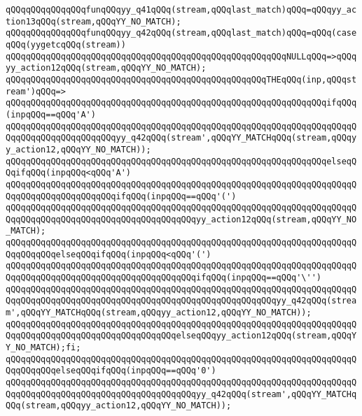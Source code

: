 \verb|qQQqqQQqqQQqqQQqfunqQQqyy_q41qQQq(stream,qQQqlast_match)qQQq=qQQqyy_action13qQQq(stream,qQQqYY_NO_MATCH);|\newline
\verb|qQQqqQQqqQQqqQQqfunqQQqyy_q42qQQq(stream,qQQqlast_match)qQQq=qQQq(caseqQQq(yygetcqQQq(stream))|\newline
\verb|qQQqqQQqqQQqqQQqqQQqqQQqqQQqqQQqqQQqqQQqqQQqqQQqqQQqqQQqNULLqQQq=>qQQqyy_action12qQQq(stream,qQQqYY_NO_MATCH);|\newline
\verb|qQQqqQQqqQQqqQQqqQQqqQQqqQQqqQQqqQQqqQQqqQQqqQQqqQQqTHEqQQq(inp,qQQqstream')qQQq=>|\newline
\verb|qQQqqQQqqQQqqQQqqQQqqQQqqQQqqQQqqQQqqQQqqQQqqQQqqQQqqQQqqQQqqQQqifqQQq(inpqQQq==qQQq'A')|\newline
\verb|qQQqqQQqqQQqqQQqqQQqqQQqqQQqqQQqqQQqqQQqqQQqqQQqqQQqqQQqqQQqqQQqqQQqqQQqqQQqqQQqqQQqqQQqqQQqyy_q42qQQq(stream',qQQqYY_MATCHqQQq(stream,qQQqyy_action12,qQQqYY_NO_MATCH));|\newline
\verb|qQQqqQQqqQQqqQQqqQQqqQQqqQQqqQQqqQQqqQQqqQQqqQQqqQQqqQQqqQQqqQQqelseqQQqifqQQq(inpqQQq<qQQq'A')|\newline
\verb|qQQqqQQqqQQqqQQqqQQqqQQqqQQqqQQqqQQqqQQqqQQqqQQqqQQqqQQqqQQqqQQqqQQqqQQqqQQqqQQqqQQqqQQqqQQqifqQQq(inpqQQq==qQQq'(')|\newline
\verb|qQQqqQQqqQQqqQQqqQQqqQQqqQQqqQQqqQQqqQQqqQQqqQQqqQQqqQQqqQQqqQQqqQQqqQQqqQQqqQQqqQQqqQQqqQQqqQQqqQQqqQQqqQQqyy_action12qQQq(stream,qQQqYY_NO_MATCH);|\newline
\verb|qQQqqQQqqQQqqQQqqQQqqQQqqQQqqQQqqQQqqQQqqQQqqQQqqQQqqQQqqQQqqQQqqQQqqQQqqQQqqQQqelseqQQqifqQQq(inpqQQq<qQQq'(')|\newline
\verb|qQQqqQQqqQQqqQQqqQQqqQQqqQQqqQQqqQQqqQQqqQQqqQQqqQQqqQQqqQQqqQQqqQQqqQQqqQQqqQQqqQQqqQQqqQQqqQQqqQQqqQQqqQQqifqQQq(inpqQQq==qQQq'\'')|\newline
\verb|qQQqqQQqqQQqqQQqqQQqqQQqqQQqqQQqqQQqqQQqqQQqqQQqqQQqqQQqqQQqqQQqqQQqqQQqqQQqqQQqqQQqqQQqqQQqqQQqqQQqqQQqqQQqqQQqqQQqqQQqqQQqyy_q42qQQq(stream',qQQqYY_MATCHqQQq(stream,qQQqyy_action12,qQQqYY_NO_MATCH));|\newline
\verb|qQQqqQQqqQQqqQQqqQQqqQQqqQQqqQQqqQQqqQQqqQQqqQQqqQQqqQQqqQQqqQQqqQQqqQQqqQQqqQQqqQQqqQQqqQQqqQQqqQQqqQQqelseqQQqyy_action12qQQq(stream,qQQqYY_NO_MATCH);fi;|\newline
\verb|qQQqqQQqqQQqqQQqqQQqqQQqqQQqqQQqqQQqqQQqqQQqqQQqqQQqqQQqqQQqqQQqqQQqqQQqqQQqqQQqelseqQQqifqQQq(inpqQQq==qQQq'0')|\newline
\verb|qQQqqQQqqQQqqQQqqQQqqQQqqQQqqQQqqQQqqQQqqQQqqQQqqQQqqQQqqQQqqQQqqQQqqQQqqQQqqQQqqQQqqQQqqQQqqQQqqQQqqQQqqQQqyy_q42qQQq(stream',qQQqYY_MATCHqQQq(stream,qQQqyy_action12,qQQqYY_NO_MATCH));|\newline
